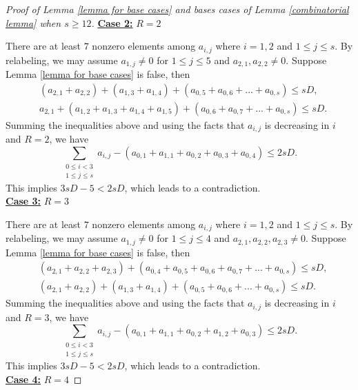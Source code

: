 \documentclass[10pt,a4paper]{amsart}
\begin{document}
\begin{proof}[Proof of Lemma \ref{lemma for base cases} and bases cases of Lemma \ref{combinatorial lemma} when $s\geq 12$]
    \noindent\underline{\textbf{Case 2:}} $R=2$

    There are at least $7$ nonzero elements among $a_{i,j}$ where $i=1,2$ and $1\leq j\leq s$. By relabeling, we may assume $a_{1,j}\neq 0$ for $1\leq j\leq 5$ and $a_{2,1},a_{2,2}\neq 0$. Suppose Lemma \ref{lemma for base cases} is false, then
    \begin{align*}
        &(a_{2,1}+a_{2,2})+(a_{1,3}+a_{1,4})+(a_{0,5}+a_{0,6}+...+a_{0,s})\leq sD,\\
        &a_{2,1}+(a_{1,2}+a_{1,3}+a_{1,4}+a_{1,5})+(a_{0,6}+a_{0,7}+...+a_{0,s})\leq sD.
    \end{align*}
    Summing the inequalities above and using the facts that $a_{i,j}$ is decreasing in $i$ and $R=2$, we have
    \begin{equation*}
        \sum_{\substack{0\leq i<3\\1\leq j\leq s}}a_{i,j}-(a_{0,1}+a_{1,1}+a_{0,2}+a_{0,3}+a_{0,4})\leq 2sD.
    \end{equation*}
    This implies $3sD-5<2sD$, which leads to a contradiction.\\

    \noindent\underline{\textbf{Case 3:}} $R=3$

    There are at least $7$ nonzero elements among $a_{i,j}$ where $i=1,2$ and $1\leq j\leq s$. By relabeling, we may assume $a_{1,j}\neq 0$ for $1\leq j\leq 4$ and $a_{2,1},a_{2,2},a_{2,3}\neq 0$. Suppose Lemma \ref{lemma for base cases} is false, then
    \begin{align*}
        &(a_{2,1}+a_{2,2}+a_{2,3})+(a_{0,4}+a_{0,5}+a_{0,6}+a_{0,7}+...+a_{0,s})\leq sD,\\
        &(a_{2,1}+a_{2,2})+(a_{1,3}+a_{1,4})+(a_{0,5}+a_{0,6}+...+a_{0,s})\leq sD.
    \end{align*}
    Summing the inequalities above and using the facts that $a_{i,j}$ is decreasing in $i$ and $R=3$, we have
    \begin{equation*}
        \sum_{\substack{0\leq i<3\\1\leq j\leq s}}a_{i,j}-(a_{0,1}+a_{1,1}+a_{0,2}+a_{1,2}+a_{0,3})\leq 2sD.
    \end{equation*}
    This implies $3sD-5<2sD$, which leads to a contradiction.\\

    \noindent\underline{\textbf{Case 4:}} $R=4$


\end{proof}
\end{document}
